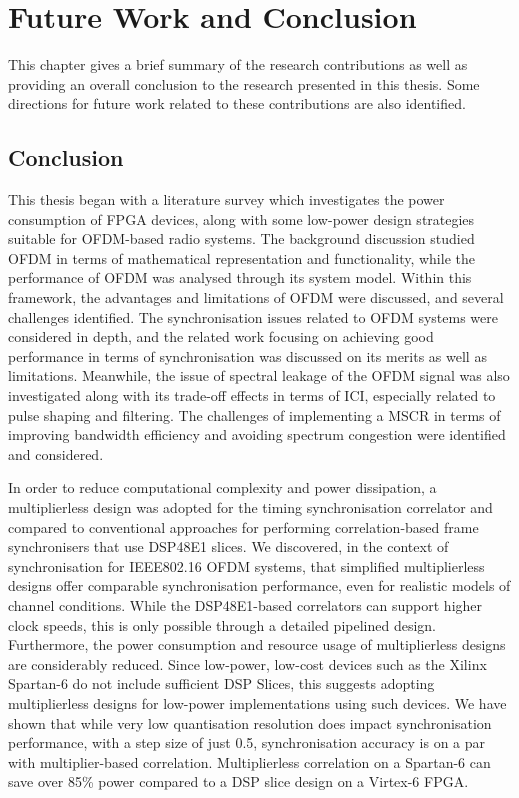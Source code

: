\chapter{Future Work and Conclusion}
\label{chap:conclusion}
This chapter gives a brief summary of the research contributions as well as providing an overall conclusion to the research presented in this thesis. 
Some directions for future work related to these contributions are also identified.

\section{Conclusion}

This thesis began with a literature survey which investigates the power consumption of FPGA devices, along with some low-power design strategies suitable for OFDM-based radio systems. 
The background discussion studied OFDM in terms of mathematical representation and functionality, while the performance of OFDM was analysed through its system model. 
Within this framework, the advantages and limitations of OFDM were discussed, and several challenges identified. 
The synchronisation issues related to OFDM systems were considered in depth, and the related work focusing on achieving good performance in terms of synchronisation was discussed on its merits as well as limitations. 
Meanwhile, the issue of spectral leakage of the OFDM signal was also investigated along with its trade-off effects in terms of ICI, especially related to pulse shaping and filtering.  
The challenges of implementing a MSCR in terms of improving bandwidth efficiency and avoiding spectrum congestion were identified and considered.

In order to reduce computational complexity and power dissipation, a multiplierless design was adopted for the timing synchronisation correlator and compared to conventional approaches for performing correlation-based frame synchronisers that use DSP48E1 slices. 
We discovered, in the context of synchronisation for IEEE802.16 OFDM systems, that simplified multiplierless designs offer comparable synchronisation performance, even for realistic models of channel conditions. 
While the DSP48E1-based correlators can support higher clock speeds, this is only possible through a detailed pipelined design.
Furthermore, the power consumption and resource usage of multiplierless designs are considerably reduced.
Since low-power, low-cost devices such as the Xilinx Spartan-6 do not include sufficient DSP Slices, this suggests adopting multiplierless designs for low-power implementations using such devices.
We have shown that while very low quantisation resolution does impact synchronisation performance, with a step size of just 0.5, synchronisation accuracy is on a par with multiplier-based correlation. 
Multiplierless correlation on a Spartan-6 can save over 85\% power compared to  a DSP slice design on a Virtex-6 FPGA.

